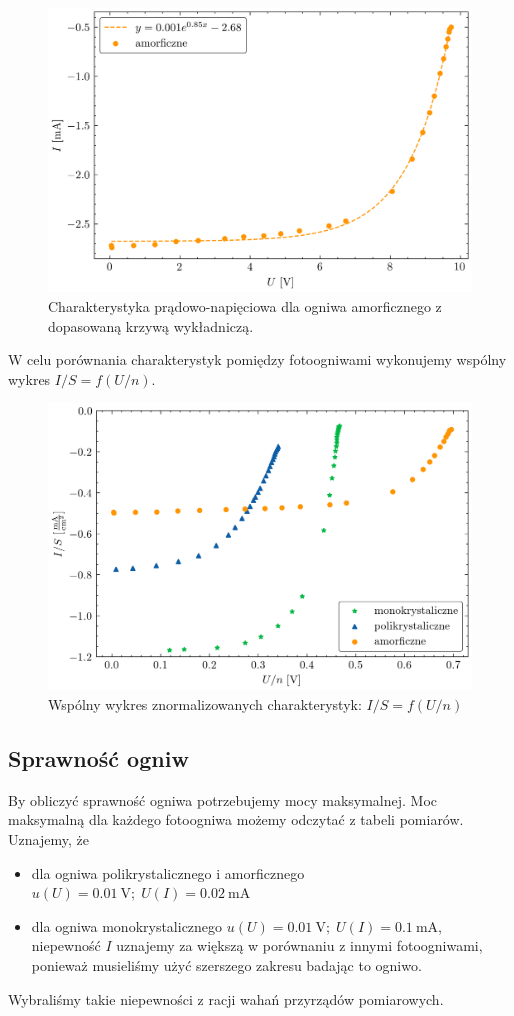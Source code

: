 \documentclass{fizykalab}
\newcommand{\volt}{\ensuremath{\:\text{V}}}
\newcommand{\mampr}{\ensuremath{\:\text{mA}}}
\begin{document}
\begin{figure}[H]
    \centering
    \includegraphics[width=0.7\linewidth]{amorf.png}
    \caption{
    Charakterystyka prądowo-napięciowa dla ogniwa amorficznego z dopasowaną
    krzywą wykładniczą.}
\end{figure}

W celu porównania charakterystyk pomiędzy fotoogniwami wykonujemy
wspólny wykres $I/S = f(U/n)$.

\begin{figure}[H]
    \centering
    \includegraphics[width=0.7\linewidth]{combined.png}
    \caption{
        Wspólny wykres znormalizowanych charakterystyk: $I/S = f(U/n)$
    }
\end{figure}

\subsection{Sprawność ogniw}
By obliczyć sprawność ogniwa potrzebujemy mocy maksymalnej. 
Moc maksymalną dla każdego fotoogniwa możemy odczytać z tabeli pomiarów.
Uznajemy, że
\begin{itemize}
    \item dla ogniwa polikrystalicznego i amorficznego $u(U) = 0.01 \volt; \; U(I) = 0.02 \mampr$
    \item dla ogniwa monokrystalicznego $u(U) = 0.01 \volt;\; U(I) = 0.1 \mampr$,
    niepewność $I$ uznajemy za większą w porównaniu z innymi fotoogniwami, 
    ponieważ musieliśmy użyć szerszego zakresu badając to ogniwo.
\end{itemize}
Wybraliśmy takie niepewności z racji wahań przyrządów pomiarowych.
\end{document}
